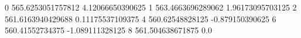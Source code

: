 0 565.6253051757812 4.12066650390625
1 563.4663696289062 1.96173095703125
2 561.6163940429688 0.11175537109375
4 560.62548828125 -0.879150390625
6 560.41552734375 -1.089111328125
8 561.504638671875 0.0
